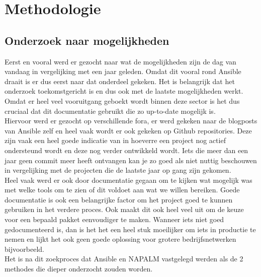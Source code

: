 
\chapter{Methodologie}
\label{ch:methodologie}

\section{Onderzoek naar mogelijkheden}
\label{ch:mogelijkheden}

Eerst en vooral werd er gezocht naar wat de mogelijkheden zijn de dag van vandaag in vergelijking met een jaar geleden. Omdat dit vooral rond Ansible draait is er dus eerst naar dat onderdeel gekeken. Het is belangrijk dat het onderzoek toekomstgericht is en dus ook met de laatste mogelijkheden werkt. Omdat er heel veel vooruitgang geboekt wordt binnen deze sector is het dus cruciaal dat dit documentatie gebruikt die zo up-to-date mogelijk is. 
\\

Hiervoor werd er gezocht op verschillende fora, er werd gekeken naar de blogposts van Ansible zelf en heel vaak wordt er ook gekeken op Github repositories. Deze zijn vaak een heel goede indicatie van in hoeverre een project nog actief ondersteund wordt en deze nog verder ontwikkeld wordt. Iets die meer dan een jaar geen commit meer heeft ontvangen kan je zo goed als niet nuttig beschouwen in vergelijking met de projecten die de laatste jaar op gang zijn gekomen. 
\\

Heel vaak werd er ook door documentatie gegaan om te kijken wat mogelijk was met welke tools om te zien of dit voldoet aan wat we willen bereiken. Goede documentatie is ook een belangrijke factor om het project goed te kunnen gebruiken in het verdere proces. Ook maakt dit ook heel veel uit om de keuze voor een bepaald pakket eenvoudiger te maken. Wanneer iets niet goed gedocumenteerd is, dan is het het een heel stuk moeilijker om iets in productie te nemen en lijkt het ook geen goede oplossing voor grotere bedrijfsnetwerken bijvoorbeeld.
\\

Het is na dit zoekproces dat Ansible en NAPALM vastgelegd werden als de 2 methodes die dieper onderzocht zouden worden.

